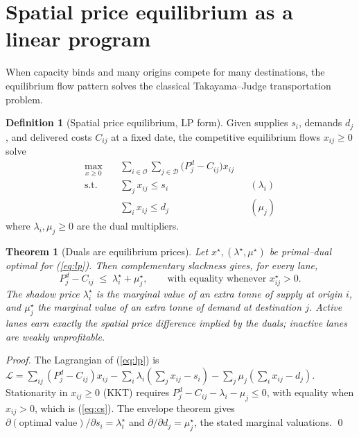 \documentclass[11pt]{article}
\theoremstyle{definition}
\newtheorem{definition}{Definition}
\theoremstyle{plain}
\newtheorem{theorem}{Theorem}
\begin{document}
\section{Spatial price equilibrium as a linear program}
\label{sec:spe}

When capacity binds and many origins compete for many destinations, the
equilibrium flow pattern solves the classical Takayama--Judge transportation
problem.

\begin{definition}[Spatial price equilibrium, LP form]
Given supplies $s_i$, demands $d_j$, and delivered costs $C_{ij}$ at a fixed
date, the competitive equilibrium flows $x_{ij}\ge 0$ solve
\begin{equation}
\begin{aligned}
\max_{x\ge 0}\quad & \sum_{i\in\mathcal O}\sum_{j\in\mathcal D}\bigl(P^d_j-C_{ij}\bigr)x_{ij}\\
\text{s.t.}\quad & \sum_{j} x_{ij}\le s_i &&(\lambda_i)\\
                 & \sum_{i} x_{ij}\le d_j &&(\mu_j)
\end{aligned}
\label{eq:lp}
\end{equation}
where $\lambda_i,\mu_j\ge 0$ are the dual multipliers.
\end{definition}

\begin{theorem}[Duals are equilibrium prices]
\label{thm:dual}
Let $x^\star,(\lambda^\star,\mu^\star)$ be primal--dual optimal for
(\ref{eq:lp}). Then complementary slackness gives, for every lane,
\begin{equation}
P^d_j - C_{ij}\;\le\;\lambda^\star_i+\mu^\star_j,
\qquad\text{with equality whenever } x^\star_{ij}>0.
\label{eq:cs}
\end{equation}
The shadow price $\lambda^\star_i$ is the marginal value of an extra tonne of
supply at origin $i$, and $\mu^\star_j$ the marginal value of an extra tonne of
demand at destination $j$. Active lanes earn exactly the spatial price
difference implied by the duals; inactive lanes are weakly unprofitable.
\end{theorem}

\begin{proof}
The Lagrangian of (\ref{eq:lp}) is
$\mathcal L=\sum_{ij}(P^d_j-C_{ij})x_{ij}
-\sum_i\lambda_i(\sum_j x_{ij}-s_i)-\sum_j\mu_j(\sum_i x_{ij}-d_j)$.
Stationarity in $x_{ij}\ge 0$ (KKT) requires
$P^d_j-C_{ij}-\lambda_i-\mu_j\le 0$, with equality when $x_{ij}>0$, which is
(\ref{eq:cs}). The envelope theorem gives
$\partial(\text{optimal value})/\partial s_i=\lambda^\star_i$ and
$\partial/\partial d_j=\mu^\star_j$, the stated marginal valuations. \qed
\end{proof}
\end{document}
